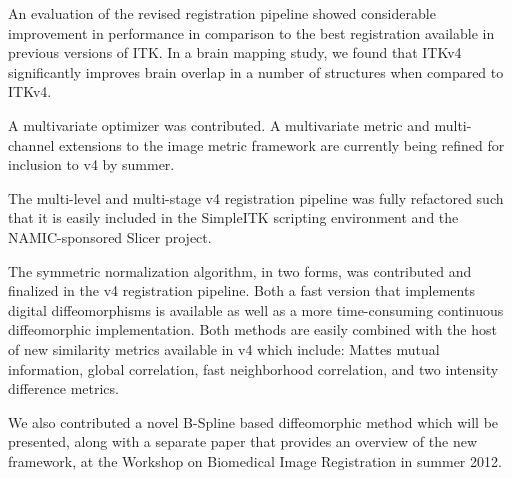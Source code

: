 \documentclass{frontiersSCNS}
\begin{document}
An evaluation of the revised registration pipeline showed considerable improvement in performance in comparison to the best registration available in previous versions of ITK. In a brain mapping study, we found that ITKv4 significantly improves brain overlap in a number of structures when compared to ITKv4. 

A multivariate optimizer was contributed. A multivariate metric and multi-channel extensions to the image metric framework are currently being refined for inclusion to v4 by summer. 

The multi-level and multi-stage v4 registration pipeline was fully refactored such that it is easily included in the SimpleITK scripting environment and the NAMIC-sponsored Slicer project.

The symmetric normalization algorithm, in two forms, was contributed and finalized in the v4 registration pipeline. Both a fast version that implements digital diffeomorphisms is available as well as a more time-consuming continuous diffeomorphic implementation. Both methods are easily combined with the host of new similarity metrics available in v4 which include: Mattes mutual information, global correlation, fast neighborhood correlation, and two intensity difference metrics. 

We also contributed a novel B-Spline based diffeomorphic method which will be presented, along with a separate paper that provides an overview of the new framework, at the Workshop on Biomedical Image Registration in summer 2012.
\end{document}
